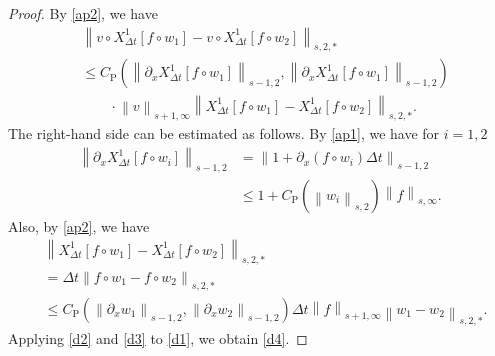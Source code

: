 \documentclass[10pt,a4paper,tbtags,leqno]{amsart}
\theoremstyle{definition}
\numberwithin{equation}{section}
\def\norm#1#2{\left\|#2\right\|_{#1}}
\begin{document}
\begin{proof} 
  By \eqref{ap2}, we have 
  \begin{align} 
    & \norm{s, 2, \ast}{v \circ {X_{\Delta t}^1} [f \circ w_1] - v \circ {X_{\Delta t}^1} [f \circ w_2]} \\ & \leq C_{\mathrm{P}} (\norm{s - 1, 2}{\partial_x {X_{\Delta t}^1} [f \circ w_1]}, \norm{s - 1, 2}{\partial_x {X_{\Delta t}^1} [f \circ w_1]}) \\ & \qquad \cdot \norm{s + 1, \infty}{v} \norm{s, 2, \ast}{{X_{\Delta t}^1} [f \circ w_1] - {X_{\Delta t}^1} [f \circ w_2]}. \label{d1}
  \end{align} 
  The right-hand side can be estimated as follows. By \eqref{ap1}, we have for $ i = 1, 2 $ 
  \begin{align} 
    \norm{s - 1, 2}{\partial_x {X_{\Delta t}^1} [f \circ w_i]} & = \norm{s - 1, 2}{1 + \partial_x (f \circ w_i) \Delta t} \\ & \leq 1 + C_{\mathrm{P}} (\norm{s, 2}{w_i}) \norm{s, \infty}{f}. \label{d2} 
  \end{align}
  Also, by \eqref{ap2}, we have 
  \begin{align}
    & \norm{s, 2, \ast}{{X_{\Delta t}^1} [f \circ w_1] - {X_{\Delta t}^1} [f \circ w_2]} \\ & = \Delta t \norm{s, 2, \ast}{f \circ w_1 - f \circ w_2} \\ 
    & \leq C_{\mathrm{P}} (\norm{s - 1, 2}{\partial_x w_1}, \norm{s - 1, 2}{\partial_x w_2}) \Delta t \norm{s + 1, \infty}{f} \norm{s, 2, \ast}{w_1 -  w_2}. \label{d3} 
  \end{align} 
  Applying \eqref{d2} and \eqref{d3} to \eqref{d1}, we obtain \eqref{d4}. 


\end{proof}
\end{document}
